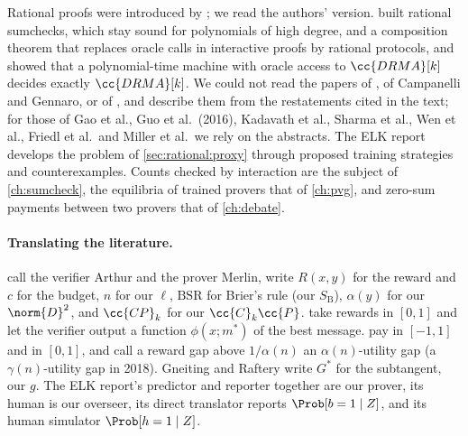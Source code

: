 \begin{refsection}
Rational proofs were introduced by \textcite{AzarMicali2012}; we read the authors' version. \Textcite{GuoEtAl2016} built rational sumchecks, which stay sound for polynomials of high degree, and a composition theorem that replaces oracle calls in interactive proofs by rational protocols, and \textcite{MusatovPotapov2023} showed that a polynomial-time machine with oracle access to $\cc{DRMA}[k]$ decides exactly $\cc{DRMA}[k]$. We could not read the papers of \textcite{GuoEtAl2014}, of Campanelli and Gennaro, or of \textcite{AzarMicali2013}, and describe them from the restatements cited in the text; for those of Gao et al., Guo et al.\ (2016), Kadavath et al., Sharma et al., Wen et al., Friedl et al.\ and Miller et al.\ we rely on the abstracts. The ELK report \parencite{ChristianoCotraXu2021} develops the problem of \cref{sec:rational:proxy} through proposed training strategies and counterexamples. Counts checked by interaction are the subject of \cref{ch:sumcheck}, the equilibria of trained provers that of \cref{ch:pvg}, and zero-sum payments between two provers that of \cref{ch:debate}.

\paragraph{Translating the literature.} \Textcite{AzarMicali2012} call the verifier Arthur and the prover Merlin, write $R(x,y)$ for the reward and $c$ for the budget, $n$ for our $\ell$, $\mathrm{BSR}$ for Brier's rule (our $S_{\mathrm B}$), $\alpha(y)$ for our $\norm{D}^2$, and $\cc{CP}_k$ for our $\cc{C}_k\cc{P}$. \Textcite{MusatovPotapov2023} take rewards in $[0,1]$ and let the verifier output a function $\phi(x;m^*)$ of the best message. \Textcite{ChenMcCauleySingh2016,ChenMcCauleySingh2018} pay in $[-1,1]$ and in $[0,1]$, and call a reward gap above $1/\alpha(n)$ an $\alpha(n)$-utility gap (a $\gamma(n)$-utility gap in 2018). Gneiting and Raftery write $G^*$ for the subtangent, our $g$. The ELK report's predictor and reporter together are our prover, its human is our overseer, its direct translator reports $\Prob[b=1\mid Z]$, and its human simulator $\Prob[h=1\mid Z]$.

\printchapterbib
\end{refsection}
